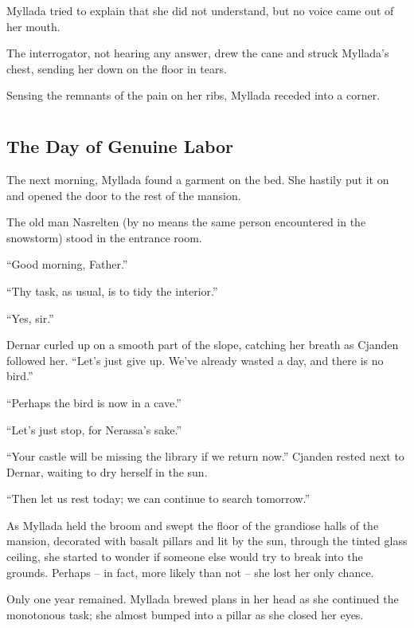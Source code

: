 Myllada tried to explain that she did not understand, but no voice came out of her mouth.

The interrogator, not hearing any answer, drew the cane and struck Myllada's chest, sending her down on the floor in tears.

Sensing the remnants of the pain on her ribs, Myllada receded into a corner.

\chapter{}

\section{The Day of Genuine Labor}

The next morning, Myllada found a garment on the bed. She hastily put it on and opened the door to the rest of the mansion.

The old man Nasrelten (by no means the same person encountered in the snowstorm) stood in the entrance room.

``Good morning, Father.''

``Thy task, as usual, is to tidy the interior.''

``Yes, sir.''

\centeredstars

Dernar curled up on a smooth part of the slope, catching her breath as Cjanden followed her. ``Let's just give up. We've already wasted a day, and there is no bird.''

``Perhaps the bird is now in a cave.''

``Let's just stop, for Nerassa's sake.''

``Your castle will be missing the library if we return now.'' Cjanden rested next to Dernar, waiting to dry herself in the sun.

``Then let us rest today; we can continue to search tomorrow.''

\centeredstars

As Myllada held the broom and swept the floor of the grandiose halls of the mansion, decorated with basalt pillars and lit by the sun, through the tinted glass ceiling, she started to wonder if someone else would try to break into the grounds. Perhaps -- in fact, more likely than not -- she lost her only chance.

Only one year remained. Myllada brewed plans in her head as she continued the monotonous task; she almost bumped into a pillar as she closed her eyes.

